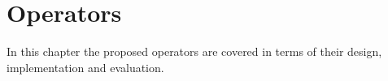 \chapter{Operators} 
\label{sec:operators}

In this chapter the proposed operators are covered in terms of their design, implementation and evaluation.\newline

